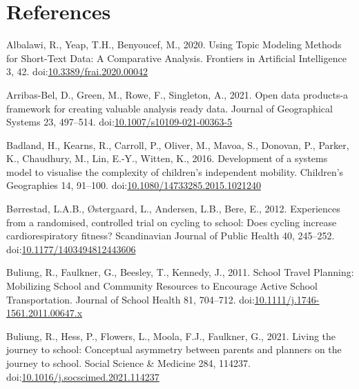 \documentclass[]{elsarticle} %
\newlength{\cslhangindent}
\newlength{\cslentryspacingunit} %
\newenvironment{CSLReferences}[2] %
 {%
  \setlength{\parindent}{0pt}
  \ifodd #1
  \let\oldpar\par
  \def\par{\hangindent=\cslhangindent\oldpar}
  \fi
  \setlength{\parskip}{#2\cslentryspacingunit}
 }%
 {}
\begin{document}
\hypertarget{references}{%
\section*{References}\label{references}}

\hypertarget{refs}{}
\begin{CSLReferences}{1}{0}
\leavevmode{}%
Albalawi, R., Yeap, T.H., Benyoucef, M., 2020. Using {Topic Modeling
Methods} for {Short}-{Text Data}: A {Comparative Analysis}. Frontiers in
Artificial Intelligence 3, 42.
doi:\href{https://doi.org/10.3389/frai.2020.00042}{10.3389/frai.2020.00042}

\leavevmode{}%
Arribas-Bel, D., Green, M., Rowe, F., Singleton, A., 2021. Open data
products-a framework for creating valuable analysis ready data. Journal
of Geographical Systems 23, 497--514.
doi:\href{https://doi.org/10.1007/s10109-021-00363-5}{10.1007/s10109-021-00363-5}

\leavevmode{}%
Badland, H., Kearns, R., Carroll, P., Oliver, M., Mavoa, S., Donovan,
P., Parker, K., Chaudhury, M., Lin, E.-Y., Witten, K., 2016. Development
of a systems model to visualise the complexity of children's independent
mobility. Children's Geographies 14, 91--100.
doi:\href{https://doi.org/10.1080/14733285.2015.1021240}{10.1080/14733285.2015.1021240}

\leavevmode{}%
Børrestad, L.A.B., Østergaard, L., Andersen, L.B., Bere, E., 2012.
Experiences from a randomised, controlled trial on cycling to school:
Does cycling increase cardiorespiratory fitness? Scandinavian Journal of
Public Health 40, 245--252.
doi:\href{https://doi.org/10.1177/1403494812443606}{10.1177/1403494812443606}

\leavevmode{}%
Buliung, R., Faulkner, G., Beesley, T., Kennedy, J., 2011. School
{Travel Planning}: Mobilizing {School} and {Community Resources} to
{Encourage Active School Transportation}. Journal of School Health 81,
704--712.
doi:\href{https://doi.org/10.1111/j.1746-1561.2011.00647.x}{10.1111/j.1746-1561.2011.00647.x}

\leavevmode{}%
Buliung, R., Hess, P., Flowers, L., Moola, F.J., Faulkner, G., 2021.
Living the journey to school: Conceptual asymmetry between parents and
planners on the journey to school. Social Science \& Medicine 284,
114237.
doi:\href{https://doi.org/10.1016/j.socscimed.2021.114237}{10.1016/j.socscimed.2021.114237}


\end{CSLReferences}
\end{document}
